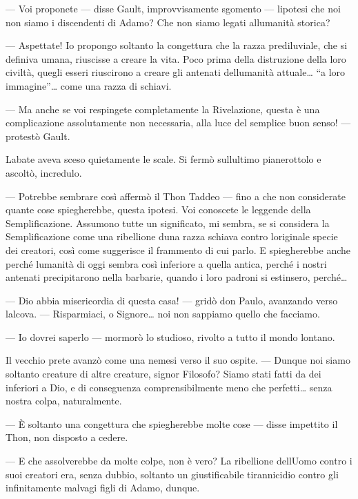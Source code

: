--- Voi proponete --- disse Gault, improvvisamente sgomento ---
l\textquotesingle ipotesi che noi non siamo i discendenti di Adamo? Che
non siamo legati all\textquotesingle umanità storica?

--- Aspettate! Io propongo soltanto la congettura che la razza
prediluviale, che si definiva umana, riuscisse a creare la vita. Poco
prima della distruzione della loro civiltà, quegli esseri riuscirono a
creare gli antenati dell\textquotesingle umanità attuale\ldots{} ``a
loro immagine''\ldots{} come una razza di schiavi.

--- Ma anche se voi respingete completamente la Rivelazione, questa è
una complicazione assolutamente non necessaria, alla luce del semplice
buon senso! --- protestò Gault.

L\textquotesingle abate aveva sceso quietamente le scale. Si fermò
sull\textquotesingle ultimo pianerottolo e ascoltò, incredulo.

--- Potrebbe sembrare così affermò il Thon Taddeo --- fino a che non
considerate quante cose spiegherebbe, questa ipotesi. Voi conoscete le
leggende della Semplificazione. Assumono tutte un significato, mi
sembra, se si considera la Semplificazione come una ribellione
d\textquotesingle una razza schiava contro l\textquotesingle originale
specie dei creatori, così come suggerisce il frammento di cui parlo. E
spiegherebbe anche perché l\textquotesingle umanità di oggi sembra così
inferiore a quella antica, perché i nostri antenati precipitarono nella
barbarie, quando i loro padroni si estinsero, perché\ldots{}

--- Dio abbia misericordia di questa casa! --- gridò don Paulo,
avanzando verso l\textquotesingle alcova. --- Risparmiaci, o
Signore\ldots{} noi non sappiamo quello che facciamo.

--- Io dovrei saperlo --- mormorò lo studioso, rivolto a tutto il mondo
lontano.

Il vecchio prete avanzò come una nemesi verso il suo ospite. --- Dunque
noi siamo soltanto creature di altre creature, signor Filosofo? Siamo
stati fatti da dei inferiori a Dio, e di conseguenza comprensibilmente
meno che perfetti\ldots{} senza nostra colpa, naturalmente.

--- È soltanto una congettura che spiegherebbe molte cose --- disse
impettito il Thon, non disposto a cedere.

--- E che assolverebbe da molte colpe, non è vero? La ribellione
dell\textquotesingle Uomo contro i suoi creatori era, senza dubbio,
soltanto un giustificabile tirannicidio contro gli infinitamente malvagi
figli di Adamo, dunque.

